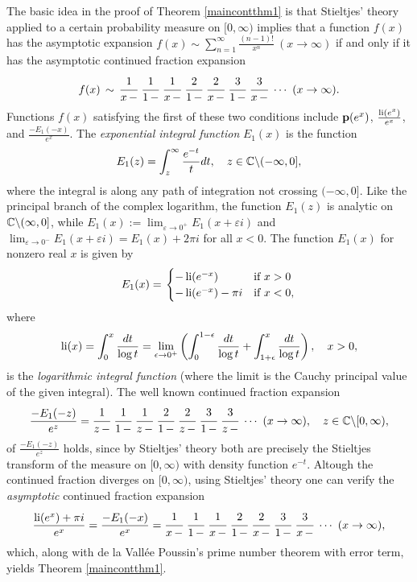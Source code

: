 \documentclass[12pt]{article}
\begin{document}
The basic idea in the proof of Theorem \ref{maincontthm1} is that Stieltjes' theory applied to a certain probability measure on $[0,\infty)$ implies that a function $f(x)$ has the asymptotic expansion $f(x) \sim \sum_{n = 1}^\infty \frac{(n-1)!}{x^n} \ (x \to \infty)$ if and only if it has the asymptotic continued fraction expansion 
$$f(x) \, \sim \, \cfrac{1}{x \,-} \  \cfrac{1}{1 \,-} \  \cfrac{1}{x \,-}\  \cfrac{2}{1 \,-}\  \cfrac{2}{x \,-} \  \cfrac{3}{1 \,-}\  \cfrac{3}{x \,-} \ \cdots \ (x \to \infty).$$
Functions $f(x)$ satisfying the first of these two conditions include ${\mathbf p}(e^x)$, $\frac{\operatorname{li}(e^x)}{e^x}$, and $\frac{-E_1(-x)}{e^x}$.  The {\it exponential integral function} $E_1(x)$ is the function
$$E_1(z) = \int_{z}^\infty \frac{e^{-t}}{t} dt, \quad z \in {\mathbb C} \backslash (-\infty, 0],$$
where the integral is along any path of integration not crossing $(-\infty, 0]$.  Like the principal branch of the complex logarithm, the function $E_1(z)$ is analytic on ${\mathbb C} \backslash (\infty,0]$, while $E_1(x) := \lim_{\varepsilon \to 0^+} E_1(x+\varepsilon i)$ and $\lim_{\varepsilon \to 0^-} E_1(x+\varepsilon i) =  E_1(x)+2 \pi i$ for all $x < 0$.  The function $E_1(x)$ for nonzero real $x$ is given by
$$ E_1(x) =   \left.
  \begin{cases}
   -\operatorname{li}(e^{-x}) & \text{if } x > 0 \\
    -\operatorname{li}(e^{-x})-\pi i   & \text{if } x < 0,
 \end{cases}
\right.$$
where $$\operatorname{li}(x) = \int_0^x \frac{dt}{\log t} = \lim_{\epsilon \to 0^+} \left( \int_0^{1-\epsilon} \frac{dt}{\log t} + \int_{1+\epsilon}^x \frac{dt}{\log t} \right), \quad  x > 0,$$
is the {\it logarithmic integral function} (where the limit is the Cauchy principal value of the given integral).  The well known continued fraction expansion
$$\frac{-E_1(-z)}{e^z} =  \cfrac{1}{z \,-} \  \cfrac{1}{1 \,-} \  \cfrac{1}{z \,-}\  \cfrac{2}{1 \,-}\  \cfrac{2}{z \,-} \  \cfrac{3}{1 \,-}\  \cfrac{3}{z \,-} \ \cdots \ (x \to \infty),  \quad z \in {\mathbb C} \backslash [0,\infty),$$ 
of $\frac{-E_1(-z)}{e^z}$ holds, since by Stieltjes' theory both are precisely the Stieltjes transform of the measure on $[0,\infty)$ with density function $e^{-t}$.  Altough the continued fraction diverges on $[0,\infty)$, using Stieltjes' theory one can verify the {\it asymptotic} continued fraction expansion 
$$\frac{\operatorname{li}(e^x)+\pi i}{e^x} = \frac{-E_1(-x)}{e^x} =  \cfrac{1}{x \,-} \  \cfrac{1}{1 \,-} \  \cfrac{1}{x \,-}\  \cfrac{2}{1 \,-}\  \cfrac{2}{x \,-} \  \cfrac{3}{1 \,-}\  \cfrac{3}{x \,-} \ \cdots \ (x \to \infty),$$ 
which, along with de la Vall\'ee Poussin's prime number theorem with error term, yields Theorem \ref{maincontthm1}.
\end{document}
